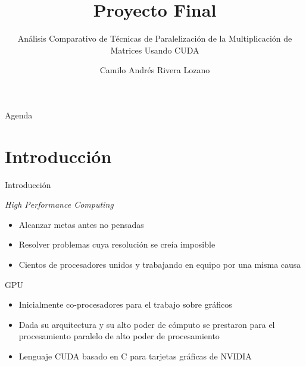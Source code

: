 \documentclass{beamer}
\title{Proyecto Final}
\subtitle{Análisis Comparativo de Técnicas de Paralelización de la Multiplicación de Matrices Usando CUDA}
\author[Camilo Andrés Rivera]{Camilo Andrés Rivera Lozano\\[7mm] }
\institute[MSE]{Escuela de Graduados en Ingeniería y Arquitectura\\ Campus Guadalajara}
\begin{document}

\begin{frame}

	\titlepage
	
\end{frame}

\begin{frame}{Agenda}
\tableofcontents
\end{frame}

\section{Introducción}
\begin{frame}{Introducción}
	\begin{block}{\textit{High Performance Computing}}
		\begin{itemize}
			\item Alcanzar metas antes no pensadas
			\item Resolver problemas cuya resolución se creía imposible
			\item Cientos de procesadores unidos y trabajando en equipo por una misma causa
		\end{itemize}
	\end{block}
	\begin{block}{GPU}
		\begin{itemize}
			\item Inicialmente co-procesadores para el trabajo sobre gráficos
			\item Dada su arquitectura y su alto poder de cómputo se prestaron para el procesamiento paralelo de alto poder de procesamiento
			\item Lenguaje CUDA basado en C para tarjetas gráficas de NVIDIA
		\end{itemize}
		
	\end{block}
\end{frame}
\end{document}
